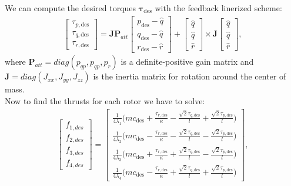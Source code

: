 We can compute the desired torques $\boldsymbol{\tau}_{\mathrm{des}}$ with the feedback linerized scheme:
\begin{align}
\begin{bmatrix}
\tau_{p,\mathrm{des}}  \\[10pt]
\tau_{q,\mathrm{des}}  \\[10pt]
\tau_{r,\mathrm{des}}
\end{bmatrix} 
= \boldsymbol{J}\boldsymbol{P}_{att}
\begin{bmatrix}
p_{\mathrm{des}} - \hat{q} \\[10pt]
q_{\mathrm{des}} - \hat{q}  \\[10pt]
r_{\mathrm{des}} - \hat{r}
\end{bmatrix} + 
\begin{bmatrix}
\hat{q} \\[10pt]
\hat{q}  \\[10pt]
\hat{r}
\end{bmatrix}
\times
\boldsymbol{J}
\begin{bmatrix}
\hat{q} \\[10pt]
\hat{q} \\[10pt]
\hat{r}
\end{bmatrix} ,
\label{eq:torques}
\end{align}
where $\boldsymbol{P}_{att} = diag(p_{qp} ,p_{qp} ,p_{r} )$ is a definite-positive gain matrix and  $\boldsymbol{J} = diag(J_{xx} ,J_{yy} ,J_{zz} )$ is the inertia matrix for rotation around the center of mass.\\
Now to find the thrusts for each rotor we have to solve:
\begin{align}
\begin{bmatrix}
f_{1,des}  \\[10pt]
f_{2,des}  \\[10pt]
f_{3,des}  \\[10pt]
f_{4,des}  
\end{bmatrix} 
=
\begin{bmatrix}
\frac{1}{4\lambda_1} \big(m c_{\mathrm{des}} + \frac{\tau_{r,\mathrm{des}}}{\kappa} - \frac{\sqrt{2}\tau_{q,\mathrm{des}}}{l} + \frac{\sqrt{2}\tau_{p,\mathrm{des}}}{l}\big) \\[10pt]
\frac{1}{4\lambda_2} \big(m c_{\mathrm{des}} - \frac{\tau_{r,\mathrm{des}}}{\kappa} - \frac{\sqrt{2}\tau_{q,\mathrm{des}}}{l} - \frac{\sqrt{2}\tau_{p,\mathrm{des}}}{l}\big) \\[10pt]
\frac{1}{4\lambda_3} \big(m c_{\mathrm{des}} + \frac{\tau_{r,\mathrm{des}}}{\kappa} + \frac{\sqrt{2}\tau_{q,\mathrm{des}}}{l} - \frac{\sqrt{2}\tau_{p,\mathrm{des}}}{l}\big)\\[10pt]
\frac{1}{4\lambda_4} \big(m c_{\mathrm{des}} - \frac{\tau_{r,\mathrm{des}}}{\kappa} + \frac{\sqrt{2}\tau_{q,\mathrm{des}}}{l} + \frac{\sqrt{2}\tau_{p,\mathrm{des}}}{l}\big)
\end{bmatrix} ,
\label{eq:thrusts}
\end{align}
